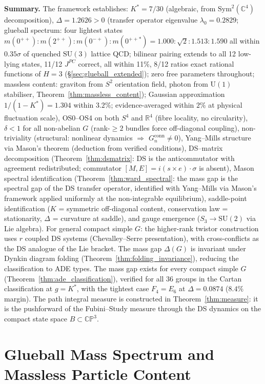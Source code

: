 \documentclass[11pt,a4paper]{article}
\theoremstyle{definition}
\theoremstyle{remark}
\newcommand{\CP}{\mathbb{CP}}
\newcommand{\C}{\mathbb{C}}
\newcommand{\R}{\mathbb{R}}
\newcommand{\SU}{\mathrm{SU}}
\begin{document}
\textbf{Summary.} The framework establishes: $K^*=7/30$ (algebraic, from $\mathrm{Sym}^2(\C^4)$ decomposition), $\Delta=1.2626>0$ (transfer operator eigenvalue $\lambda_0=0.2829$; glueball spectrum: four lightest states $m(0^{++}):m(2^{++}):m(0^{-+}):m(0^{++*})=1.000:\sqrt{2}:1.513:1.590$ all within $0.35\sigma$ of quenched $\SU(3)$ lattice QCD; bilinear pairing extends to all 12 low-lying states, 11/12 $J^{PC}$ correct, all within 11\%, 8/12 ratios exact rational functions of $H=3$ (\S\ref{sec:glueball_extended}); zero free parameters throughout; massless content: graviton from $S^2$ orientation field, photon from $\mathrm{U}(1)$ stabiliser, Theorem~\ref{thm:massless_content}); Gaussian approximation $1/(1-K^*)=1.304$ within $3.2\%$; evidence-averaged within $2\%$ at physical fluctuation scale), OS0--OS4 on both $S^4$ and $\R^4$ (fibre locality, no circularity), $\delta<1$ for all non-abelian $G$ (rank-$\geq 2$ bundles force off-diagonal coupling), non-triviality (structural: nonlinear dynamics $\Rightarrow$ $G_n^{\mathrm{conn}}\neq 0$), Yang--Mills structure via Mason's theorem (deduction from verified conditions), DS--matrix decomposition (Theorem~\ref{thm:dsmatrix}: DS is the anticommutator with agreement redistributed; commutator $[M,E]=i(s\times e)\cdot\sigma$ is absent), Mason spectral identification (Theorem~\ref{thm:ward_spectral}: the mass gap is the spectral gap of the DS transfer operator, identified with Yang--Mills via Mason's framework applied uniformly at the non-integrable equilibrium), saddle-point identification ($K$ = symmetric off-diagonal content, conservation law = stationarity, $\Delta$ = curvature at saddle), and gauge emergence ($S_3\to\SU(2)$ via Lie algebra). For general compact simple $G$: the higher-rank twistor construction uses $r$ coupled DS systems (Chevalley--Serre presentation), with cross-conflicts as the DS analogue of the Lie bracket. The mass gap $\Delta(G)$ is invariant under Dynkin diagram folding (Theorem~\ref{thm:folding_invariance}), reducing the classification to ADE types. The mass gap exists for every compact simple $G$ (Theorem~\ref{thm:ade_classification}), verified for all $36$ groups in the Cartan classification at $g=K^*$, with the tightest case $F_4=E_6$ at $\Delta=0.0874$ ($8.4\%$ margin). The path integral measure is constructed in Theorem~\ref{thm:measure}: it is the pushforward of the Fubini--Study measure through the DS dynamics on the compact state space $B\subset\CP^3$.


\section{Glueball Mass Spectrum and Massless Particle Content}\label{sec:glueball}
\end{document}
